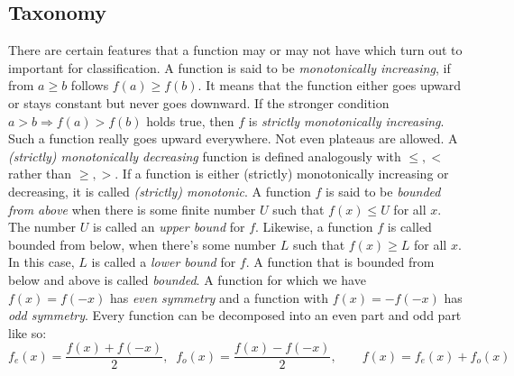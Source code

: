 
\subsection{Taxonomy}
There are certain features that a function may or may not have which turn out to important for classification. A function is said to be \emph{monotonically increasing}, if from $a \geq b$ follows $f(a) \geq f(b)$. It means that the function either goes upward or stays constant but never goes downward. If the stronger condition  $a > b \Rightarrow f(a) > f(b)$ holds true, then $f$ is \emph{strictly monotonically increasing}. Such a function really goes upward everywhere. Not even plateaus are allowed. A \emph{(strictly) monotonically decreasing} function is defined analogously with $\leq, <$ rather than $\geq, >$. If a function is either (strictly) monotonically increasing or decreasing, it is called \emph{(strictly) monotonic}. A function $f$ is said to be \emph{bounded from above} when there is some finite number $U$ such that $f(x) \leq U$ for all $x$. The number $U$ is called an \emph{upper bound} for $f$. Likewise, a function $f$ is called bounded from below, when there's some number $L$ such that $f(x) \geq L$ for all $x$. In this case, $L$ is called a \emph{lower bound} for $f$. A function that is bounded from below and above is called \emph{bounded}. A function for which we have $f(x) = f(-x)$ has \emph{even symmetry} and a function with $f(x) = -f(-x)$ has \emph{odd symmetry}. Every function can be decomposed into an even part and odd part like so: 
\begin{equation}
\label{Eq:EvenOddFuncDecomp}
f_e(x) = \frac{f(x) + f(-x)}{2}, \;\;
f_o(x) = \frac{f(x) - f(-x)}{2}, \qquad
f(x) = f_e(x) + f_o(x)
\end{equation}

